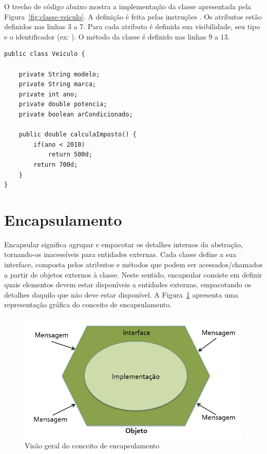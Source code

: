 O trecho de código abaixo mostra a implementação da classe apresentada pela Figura~\ref{fig:classe-veiculo}. A definição é feita pelas instruções . Os atributos estão definidos nas linhas 3 a 7. Para cada atributo é definida sua visibilidade, seu tipo e o identificador (ex: ). O método da classe é definido nas linhas 9 a 13.

\begin{verbatim}
public class Veiculo { 
	
	private String modelo; 
	private String marca; 
	private int ano; 
	private double potencia; 
	private boolean arCondicionado; 
	
	public double calculaImposto() { 
		if(ano < 2010) 
			return 500d; 
		return 700d; 
	} 
}
\end{verbatim}


\section{Encapsulamento}
Encapsular significa agrupar e empacotar os detalhes internos da abstração, tornando-os inacessíveis para entidades externas. Cada classe define a sua interface, composta pelos atributos e métodos que podem ser acessados/chamados a partir de objetos externos à classe. Neste sentido, encapsular consiste em definir quais elementos devem estar disponíveis a entidades externas, empacotando os detalhes daquilo que não deve estar disponível. A Figura~\ref{fig:encapsulamento} apresenta uma representação gráfica do conceito de encapsulamento.

\begin{figure}[h]
	\centering
	\includegraphics[width=0.6\textheight]{img/encapsulamento}
	\caption{Visão geral do conceito de encapsulamento}
	\label{fig:encapsulamento}
\end{figure}

